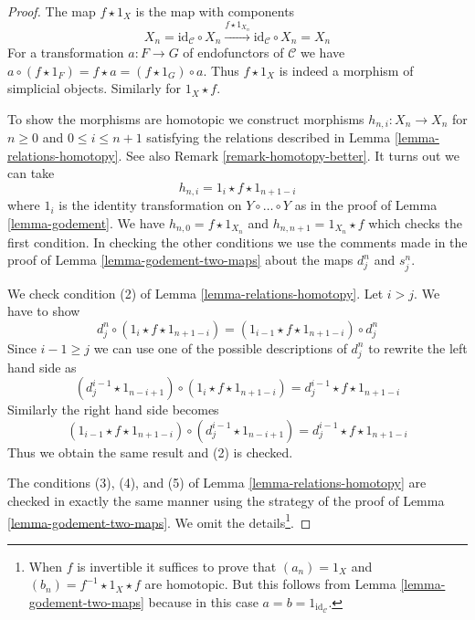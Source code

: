 \documentclass{stacks-project}
\theoremstyle{plain}
\theoremstyle{definition}
\theoremstyle{remark}
\numberwithin{equation}{subsection}
\begin{document}
\begin{proof}
The map $f \star 1_X$ is the map with components
$$
X_n = \text{id}_\mathcal{C} \circ X_n
\xrightarrow{f \star 1_{X_n}}
\text{id}_\mathcal{C} \circ X_n = X_n
$$
For a transformation $a : F \to G$ of endofunctors of $\mathcal{C}$ we have
$a \circ (f \star 1_F) = f \star a = (f \star 1_G) \circ a$. Thus $f \star 1_X$
is indeed a morphism of simplicial objects. Similarly for $1_X \star f$.

\medskip\noindent
To show the morphisms are homotopic we construct
morphisms $h_{n, i} : X_n \to X_n$ for $n \geq 0$ and $0 \leq i \leq n + 1$
satisfying the relations described in Lemma \ref{lemma-relations-homotopy}.
See also Remark \ref{remark-homotopy-better}. It turns out we can take
$$
h_{n, i} = 1_i \star f \star 1_{n + 1 - i}
$$
where $1_i$ is the identity transformation on $Y \circ \ldots \circ Y$
as in the proof of Lemma \ref{lemma-godement}. We have
$h_{n, 0} = f \star 1_{X_n}$ and $h_{n, n + 1} = 1_{X_n} \star f$
which checks the first condition. In checking the other conditions
we use the comments made in the proof of
Lemma \ref{lemma-godement-two-maps} about the maps $d^n_j$ and $s^n_j$.

\medskip\noindent
We check condition (2) of Lemma \ref{lemma-relations-homotopy}.
Let $i > j$. We have to show
$$
d^n_j \circ (1_i \star f \star 1_{n + 1 - i}) =
(1_{i - 1} \star f \star 1_{n + 1 - i}) \circ d^n_j
$$
Since $i - 1 \geq j$ we can use one of the possible descriptions of
$d^n_j$ to rewrite the left hand side as
$$
(d^{i - 1}_j \star 1_{n - i + 1}) \circ (1_i \star f \star 1_{n + 1 - i}) =
d^{i - 1}_j \star f \star 1_{n + 1 - i}
$$
Similarly the right hand side becomes
$$
(1_{i - 1} \star f \star 1_{n + 1 - i}) \circ
(d^{i - 1}_j \star 1_{n - i + 1}) =
d^{i - 1}_j \star f \star 1_{n + 1 - i}
$$
Thus we obtain the same result and (2) is checked.

\medskip\noindent
The conditions (3), (4), and (5) of Lemma \ref{lemma-relations-homotopy}
are checked in exactly the same manner using the strategy of the proof
of Lemma \ref{lemma-godement-two-maps}. We omit the details\footnote{When
$f$ is invertible it suffices to prove that $(a_n) = 1_X$ and
$(b_n) = f^{-1} \star 1_X \star f$ are homotopic.
But this follows from Lemma \ref{lemma-godement-two-maps}
because in this case $a = b = 1_{\text{id}_\mathcal{C}}$.}.
\end{proof}
\end{document}
